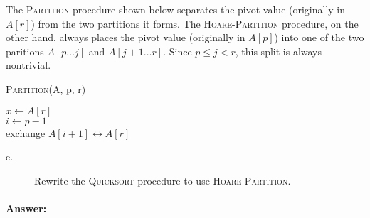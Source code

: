 \documentclass[a4paper,10pt]{article}
\newcommand{\answer}{\paragraph{Answer:}}
\begin{document}
The \textsc{Partition} procedure shown below separates the pivot value (originally in $A[r]$) from the
two partitions it forms. The \textsc{Hoare-Partition} procedure,
on the other hand, always places the pivot value (originally in $A[p]$) into one of the two paritions
$A[p\ldots j]$ and $A[j + 1\ldots r]$. Since $p\leq j < r$, this
split is always nontrivial.

\begin{algorithm}[H]
\caption{\textsc{Partition}(A, p, r)}
$x\leftarrow A[r]$\\
$i \leftarrow p - 1$\\
exchange $A[i + 1]\leftrightarrow A[r]$\\
\end{algorithm}

\begin{description}
\item[e. \hspace{9pt}] Rewrite the \textsc{Quicksort} procedure to use \textsc{Hoare-Partition}.
\end{description}

\answer
\end{document}
